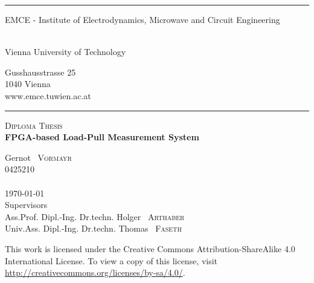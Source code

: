 \documentclass[12pt,a4paper,parskip=full,abstract=true,BCOR=12mm]{scrreprt}
\begin{document}
\begin{titlepage}
    \enlargethispage{1cm}
    \centering
    \rule{\linewidth}{0.4pt}
    \begin{minipage}[t]{0.60\linewidth}
        \flushleft
        \begin{large}
            EMCE - Institute of Electrodynamics, Microwave and Circuit Engineering
        \end{large}\\
        Vienna University of Technology
    \end{minipage}
    \hfill
    \begin{minipage}[t]{0.30\linewidth}
        \flushright
        Gusshausstrasse 25\\
        1040 Vienna\\
        www.emce.tuwien.ac.at
    \end{minipage}
    \vspace*{-3pt}
    \rule{\linewidth}{0.4pt}

    \vspace*{5cm}
    {\Huge \textsc{Diploma Thesis}}\\
    \vspace*{1cm}
    {\large \textbf{FPGA-based Load-Pull Measurement System}}

    \vspace*{2cm}
    {\large Gernot ~\textsc{Vormayr} \\ 0425210 \\ } ~\\

    \vspace*{2cm}
    {\today } ~\\

    \vfill
    {Supervisors} ~\\\vspace*{0.1cm}
    {Ass.Prof. Dipl.-Ing. Dr.techn. \large Holger ~\textsc{Arthaber}} ~\\
    {Univ.Ass. Dipl.-Ing. Dr.techn. \large Thomas ~\textsc{Faseth}}
    \vspace*{2cm}

    \clearpage
\end{titlepage}

\thispagestyle{empty}
\vspace*{\fill}
\begin{center}
\begin{minipage}{.3\textwidth}
    \doclicenseImage
\end{minipage}
\begin{minipage}{.6\textwidth}
    This work is licensed under the Creative Commons Attribution-ShareAlike 4.0 International License.
    To view a copy of this license, visit \url{http://creativecommons.org/licenses/by-sa/4.0/}.
\end{minipage}
\end{center}
\end{document}

